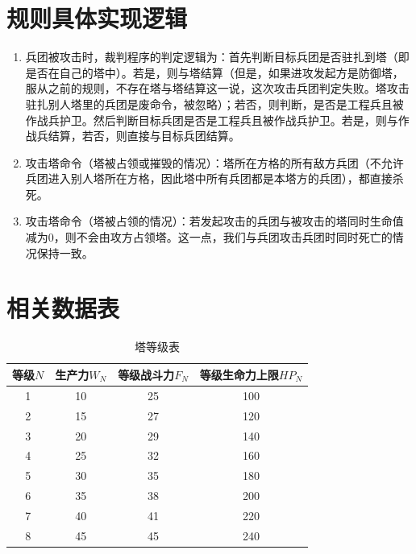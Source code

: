 \documentclass[a4paper,4pt]{article}
\begin{document}
\section{规则具体实现逻辑}\label{细则}
\begin{enumerate}[fullwidth, itemindent=2em, label=(\arabic*)]
  \item 兵团被攻击时，裁判程序的判定逻辑为：首先判断目标兵团是否驻扎到塔（即是否在自己的塔中）。若是，则与塔结算（但是，如果进攻发起方是防御塔，服从之前的规则，不存在塔与塔结算这一说，这次攻击兵团判定失败。塔攻击驻扎别人塔里的兵团是废命令，被忽略）；若否，则判断，是否是工程兵且被作战兵护卫。然后判断目标兵团是否是工程兵且被作战兵护卫。若是，则与作战兵结算，若否，则直接与目标兵团结算。
  \item 攻击塔命令（塔被占领或摧毁的情况）：塔所在方格的所有敌方兵团（不允许兵团进入别人塔所在方格，因此塔中所有兵团都是本塔方的兵团），都直接杀死。
  \item 攻击塔命令（塔被占领的情况）：若发起攻击的兵团与被攻击的塔同时生命值减为0，则不会由攻方占领塔。这一点，我们与兵团攻击兵团时同时死亡的情况保持一致。

\end{enumerate}


\section{相关数据表}
\begin{table}[htbp]
  \centering
  \caption{塔等级表}
  \label{塔等级表}%
  \begin{tabular}{c|c|c|c}
    \hline
    等级$N$ & 生产力$W_N$ & 等级战斗力$F_N$ & 等级生命力上限$HP_N$ \bigstrut \\
    \hline
    1       & 10          & 25              & 100 \bigstrut                  \\
    \hline
    2       & 15          & 27              & 120 \bigstrut                  \\
    \hline
    3       & 20          & 29              & 140 \bigstrut                  \\
    \hline
    4       & 25          & 32              & 160 \bigstrut                  \\
    \hline
    5       & 30          & 35              & 180 \bigstrut                  \\
    \hline
    6       & 35          & 38              & 200 \bigstrut                  \\
    \hline
    7       & 40          & 41              & 220 \bigstrut                  \\
    \hline
    8       & 45          & 45              & 240 \bigstrut                  \\
    \hline
  \end{tabular}%

\end{table}%
\end{document}
